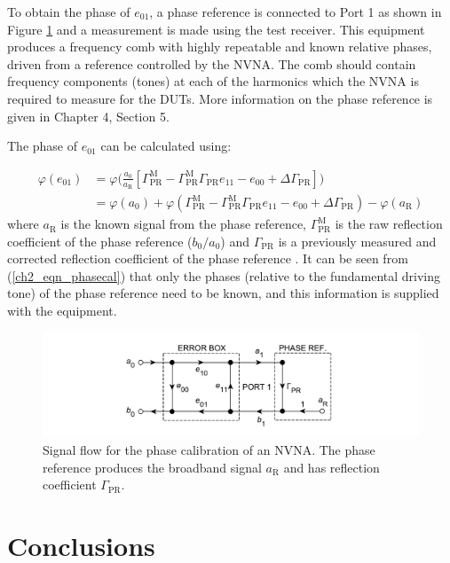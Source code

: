 \documentclass[../thesis/thesis.tex]{subfiles}
\begin{document}
To obtain the phase of $e_{01}$, a phase reference is connected to Port 1 as shown in Figure \ref{ch2_fig_phasecal} and a measurement is made using the test receiver. This equipment produces a frequency comb with highly repeatable and known relative phases, driven from a reference controlled by the NVNA. The comb should contain frequency components (tones) at each of the harmonics which the NVNA is required to measure for the DUTs. More information on the phase reference is given in Chapter 4, Section 5.

The phase of $e_{01}$ can be calculated using:

\begin{align}
	\varphi(e_{01}) &= \varphi\Big(\frac{a_0}{a_\textrm{R}}[\Gamma^\textrm{M}_\textrm{PR}-\Gamma^\textrm{M}_\textrm{PR}\Gamma_\textrm{PR}e_{11}-e_{00}+\Delta\Gamma_\textrm{PR}]\Big) \\
	&=\varphi(a_0) + \varphi(\Gamma^\textrm{M}_\textrm{PR}-\Gamma^\textrm{M}_\textrm{PR}\Gamma_\textrm{PR}e_{11}-e_{00}+\Delta\Gamma_\textrm{PR}) - \varphi(a_\textrm{R}) \label{ch2_eqn_phasecal}
\end{align}
where $a_\textrm{R}$ is the known signal from the phase reference, $\Gamma^\textrm{M}_\textrm{PR}$ is the raw reflection coefficient of the phase reference ($b_0/a_0$) and $\Gamma_\textrm{PR}$ is a previously measured and corrected reflection coefficient of the phase reference \cite{Lin_2012}. It can be seen from (\ref{ch2_eqn_phasecal}) that only the phases (relative to the fundamental driving tone) of the phase reference need to be known, and this information is supplied with the equipment.

\begin{figure}
	\centering
	\includegraphics[width=\textwidth]{ch2_phasecal}
	\caption[The phase calibration of an NVNA.]{Signal flow for the phase calibration of an NVNA. The phase reference produces the broadband signal $a_\textrm{R}$ and has reflection coefficient $\Gamma_\textrm{PR}$.}
	\label{ch2_fig_phasecal}
\end{figure}

\newpage
\section{Conclusions}
\end{document}
